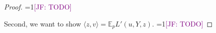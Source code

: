\documentclass{article}
\newcommand{\Comments}{1}
\newcommand{\mynote}[2]{\ifnum\Comments=1\textcolor{#1}{#2}\fi}
\newcommand{\jessie}[1]{\mynote{purple}{[JF: #1]}}
\newcommand{\reals}{\mathbb{R}}
\newcommand{\E}{\mathbb{E}}
\newcommand{\inprod}[2]{\langle #1, #2 \rangle}%
\begin{document}
\begin{proof}
\jessie{TODO}


Second, we want to show $\inprod{z}{v} = \E_p L'(u,Y,z)$.
\jessie{TODO}



\iffalse
	Suppose we are given $z\in \reals^d$.
	We have $\E_p \partial L(u,Y)$ compact (by convexity of $L$).
	Additionally, we know for all $\omega \in \Omega$, $\sup_{x \in \partial L'(u,\omega,z)} \inprod{x}{z} := \delta_{\partial L(u,\omega)}(z)$ is attained, and for any $v \in \delta_{\partial L(u,\omega)}(z)$, we particularly have $v \in \partial L'(u,\omega, z)$.
	
	
	
	\begin{itemize}
		\item $v \in \E_p \partial L(u,Y)$
		\item $\inprod{z}{v'} = \E_p L'(u,Y,z)$.
	\end{itemize}
\fi	
	 
\end{proof}
\end{document}
